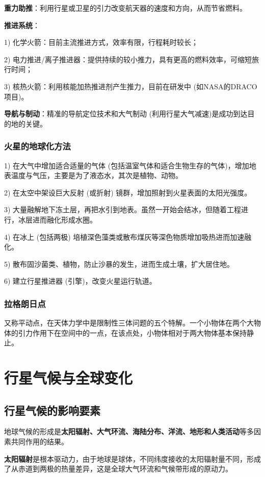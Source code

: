 \documentclass[12pt,a4paper]{article}
\begin{document}
	\textbf{重力助推}：利用行星或卫星的引力改变航天器的速度和方向，从而节省燃料。
	
	\textbf{推进系统}：
	
	1) 化学火箭：目前主流推进方式，效率有限，行程耗时较长；
	
	2) 电力推进/离子推进器：提供持续的较小推力，具有更高的燃料效率，可缩短旅行时间；
	
	3) 核热火箭：利用核能加热推进剂产生推力，目前在研发中 (如NASA的DRACO项目)。
	
	\textbf{导航与制动}：精准的导航定位技术和大气制动 (利用行星大气减速)是成功到达目的地的关键。
	
	\subsubsection{火星的地球化方法}
	
	1) 在大气中增加适合适量的气体 (包括温室气体和适合生物生存的气体)，增加地表温度与气压，主要是为了液态水，其次是植物、动物。
	
	2) 在太空中架设巨大反射 (或折射) 镜群，增加照射到火星表面的太阳光强度。
	
	3) 大量融解地下冻土层，再把水引到地表。虽然一开始会结冰，但随着工程进行，冰层进而融化形成水圈。
	
	4) 在冰上 (包括两极) 培植深色藻类或散布煤灰等深色物质增加吸热进而加速融化。
	
	5) 散布固沙菌类、植物，防止沙暴的发生，进而生成土壤，扩大居住地。
	
	6) 建立行星推进器 (引擎)，改变火星运行轨道。
	
	\subsubsection{拉格朗日点}
	又称平动点，在天体力学中是限制性三体问题的五个特解。一个小物体在两个大物体的引力作用下在空间中的一点，在该点处，小物体相对于两大物体基本保持静止。
	
	\section{行星气候与全球变化}
	
	\subsection{行星气候的影响要素}
	地球气候的形成是\textbf{太阳辐射、大气环流、海陆分布、洋流、地形和人类活动}等多因素共同作用的结果。
	
	\textbf{太阳辐射}是根本驱动力，由于地球是球体，不同纬度接收的太阳辐射量不同，形成了从赤道到两极的热量差异，这是全球大气环流和气候带形成的原动力。
	
\end{document}
